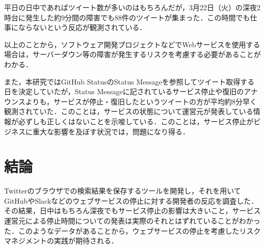 \documentclass[uplatex,twocolumn]{jsarticle}
\begin{document}
平日の日中であればツイート数が多いのはもちろんだが，3月22日（火）の深夜2時台に発生した約9分間の障害でも88件のツイートが集まった．この時間でも仕事にならないという反応が観測されている．

以上のことから，ソフトウェア開発プロジェクトなどでWebサービスを使用する場合は，サーバーダウン等の障害が発生するリスクを考慮する必要があることがわかる．

また，本研究ではGitHub StatusのStatus Messageを参照してツイート取得する日を決定していたが，Status Messageに記されているサービス停止や復旧のアナウンスよりも，サービスが停止・復旧したというツイートの方が平均約8分早く観測されていた．このことは，サービスの状態について運営元が発表している情報が必ずしも正しくはないことを示唆している．このことは，サービス停止がビジネスに重大な影響を及ぼす状況では，問題になり得る．

\section{結論}
Twitterのブラウザでの検索結果を保存するツールを開発し，それを用いてGitHubやSlackなどのウェブサービスの停止に対する開発者の反応を調査した．その結果，日中はもちろん深夜でもサービス停止の影響は大きいこと，サービス運営元による停止時間についての発表は実際のそれとはずれていることがわかった．このようなデータがあることから，ウェブサービスの停止を考慮したリスクマネジメントの実践が期待される．

\end{document}
